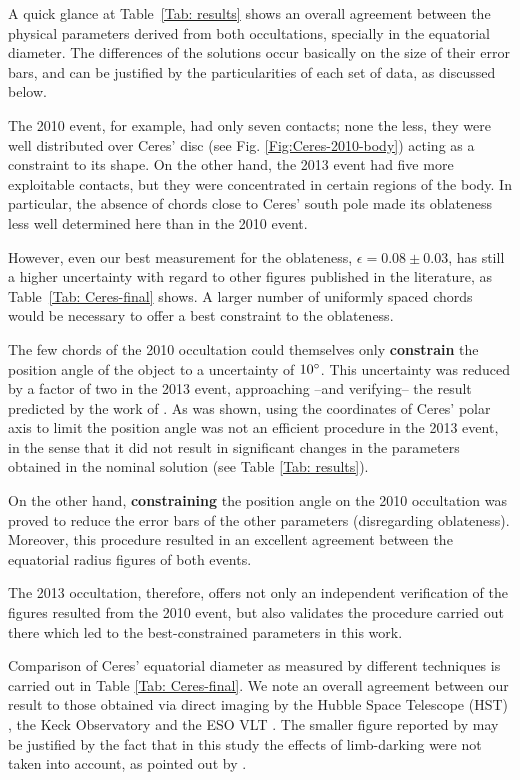 \documentclass[useAMS,usenatbib]{mn2e}
\begin{document}
A quick glance at Table~\ref{Tab: results} shows an overall agreement between the physical parameters derived from both occultations, specially in the equatorial diameter. The differences of the solutions occur basically on the size of their error bars, and can be justified by the particularities of each set of data, as discussed below. 

The 2010 event, for example, had only seven contacts; none the less, they were well distributed over Ceres' disc (see Fig. \ref{Fig:Ceres-2010-body}) acting as a constraint to its shape. On the other hand, the 2013 event had five more exploitable contacts, but they were concentrated in certain regions of the body. In particular, the absence of chords close to Ceres' south pole made its oblateness less well determined here than in the 2010 event.

However, even our best measurement for the oblateness, $\epsilon=0.08 \pm 0.03$, has still a higher uncertainty with regard to other figures published in the literature, as Table~\ref{Tab: Ceres-final} shows. A larger number of uniformly spaced chords would be necessary to offer a best constraint to the oblateness. 

The few chords of the 2010 occultation could themselves only \textbf{constrain} the position angle of the object to a uncertainty of $10\hbox{$^\circ$}$. This uncertainty was reduced by a factor of two in the 2013 event, approaching --and verifying-- the result predicted by the work of \cite{Drummond2014}. As was shown, using the coordinates of Ceres' polar axis to limit the position angle was not an efficient procedure in the 2013 event, in the sense that it did not result in significant changes in the parameters obtained in the nominal solution (see Table \ref{Tab: results}).

On the other hand, \textbf{constraining} the position angle on the 2010 occultation was proved to reduce the error bars of the other parameters (disregarding oblateness). Moreover, this procedure resulted in an excellent agreement between the equatorial radius figures of both events.

The 2013 occultation, therefore, offers not only an independent verification of the figures resulted from the 2010 event, but also validates the procedure carried out there which led to the best-constrained parameters in this work.

Comparison of Ceres' equatorial diameter as measured by different techniques is carried out in Table \ref{Tab: Ceres-final}. We note an overall agreement between our result to those obtained via direct imaging by the Hubble Space Telescope (HST) \citep{Thomas2005}, the Keck Observatory and the ESO VLT \citep{Drummond2014}. The smaller figure reported by \cite{Carry2008} may be justified by the fact that in this study the effects of limb-darking were not taken into account, as pointed out by \cite{Drummond2014}.
\end{document}
